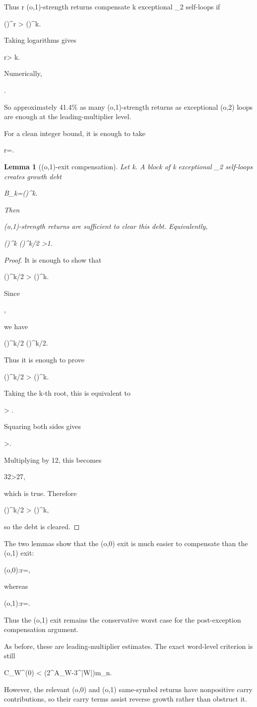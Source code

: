 \documentclass[11pt,letterpaper]{amsart}
\def\({}%
\def\){}%
\def\[{ }%
\def\]{ }%
\theoremstyle{definition}
\theoremstyle{plain}
\newtheorem{lemma}{Lemma}
\theoremstyle{plain}
\theoremstyle{remark}
\begin{document}
Thus \(r\) \((o,1)\)-strength returns compensate \(k\) exceptional
\(\Omega_2\) self-loops if
\[
\left(\right)^r
>
\left(\right)^k.
\]
Taking logarithms gives
\[
r>
k.
\]
Numerically,
\[
.
\]
So approximately \(41.4\%\) as many \((o,1)\)-strength returns as
exceptional \((o,2)\) loops are enough at the leading-multiplier level.

For a clean integer bound, it is enough to take
\[
r=\left\lceil{}\right\rceil.
\]

\begin{lemma}[\((o,1)\)-exit compensation]
\label{lem:o1-exit-compensation}
Let \(k\).  A block of \(k\) exceptional \(\Omega_2\) self-loops
creates growth debt
\[
B_k=\left(\right)^k.
\]
Then
\[
\left\lceil{}\right\rceil
\]
\((o,1)\)-strength returns are sufficient to clear this debt.  Equivalently,
\[
\left(\right)^k
\left(\right)^{\lceil k/2\rceil}
>1.
\]
\end{lemma}

\begin{proof}
It is enough to show that
\[
\left(\right)^{\lceil k/2\rceil}
>
\left(\right)^k.
\]
Since
\[
\left\lceil{}\right\rceil\ge {},
\]
we have
\[
\left(\right)^{\lceil k/2\rceil}
\ge
\left(\right)^{k/2}.
\]
Thus it is enough to prove
\[
\left(\right)^{k/2}
>
\left(\right)^k.
\]
Taking the \(k\)-th root, this is equivalent to
\[
>
.
\]
Squaring both sides gives
\[
>.
\]
Multiplying by \(12\), this becomes
\[
32>27,
\]
which is true.  Therefore
\[
\left(\right)^{\lceil k/2\rceil}
>
\left(\right)^k,
\]
so the debt is cleared.
\end{proof}

The two lemmas show that the \((o,0)\) exit is much easier to compensate
than the \((o,1)\) exit:
\[
(o,0):\qquad r=\left\lceil{}\right\rceil,
\]
whereas
\[
(o,1):\qquad r=\left\lceil{}\right\rceil.
\]
Thus the \((o,1)\) exit remains the conservative worst case for the
post-exception compensation argument.

As before, these are leading-multiplier estimates.  The exact
word-level criterion is still
\[
C_W^{(0)}
<
\left(2^{A_W}-3^{|W|}\right)m_n.
\]
However, the relevant \((o,0)\) and \((o,1)\) same-symbol returns have
nonpositive carry contributions, so their carry terms assist reverse
growth rather than obstruct it.
\end{document}
